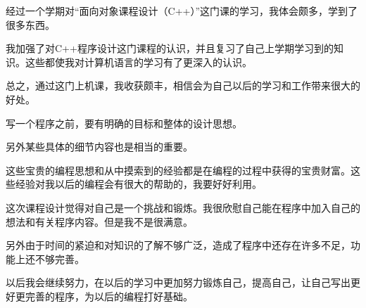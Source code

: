 经过一个学期对“面向对象课程设计（C++）”这门课的学习，我体会颇多，学到了很多东西。

我加强了对C++程序设计这门课程的认识，并且复习了自己上学期学习到的知识。这些都使我对计算机语言的学习有了更深入的认识。

总之，通过这门上机课，我收获颇丰，相信会为自己以后的学习和工作带来很大的好处。

写一个程序之前，要有明确的目标和整体的设计思想。

另外某些具体的细节内容也是相当的重要。

这些宝贵的编程思想和从中摸索到的经验都是在编程的过程中获得的宝贵财富。这些经验对我以后的编程会有很大的帮助的，我要好好利用。  

这次课程设计觉得对自己是一个挑战和锻炼。我很欣慰自己能在程序中加入自己的想法和有关程序内容。但是我不是很满意。

另外由于时间的紧迫和对知识的了解不够广泛，造成了程序中还存在许多不足，功能上还不够完善。

以后我会继续努力，在以后的学习中更加努力锻炼自己，提高自己，让自己写出更好更完善的程序，为以后的编程打好基础。
